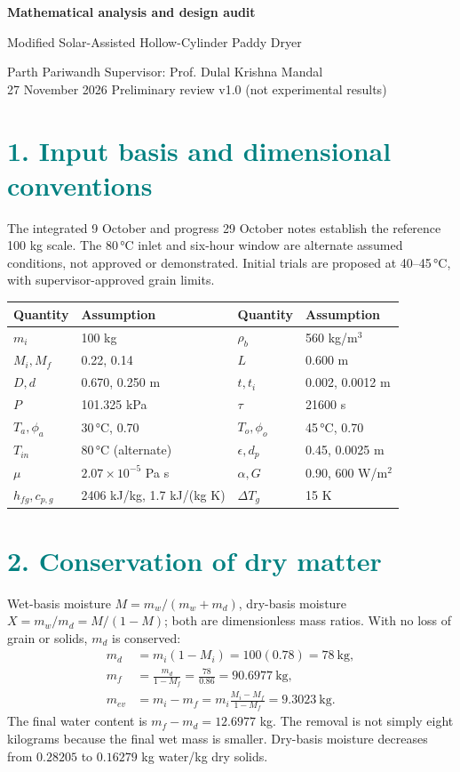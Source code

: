 \documentclass[11pt,a4paper]{article}
\newcommand{\sect}[1]{\section*{\textcolor{teal}{#1}}}
\begin{document}
{\LARGE\bfseries\color{navy} Mathematical analysis and design audit}\par
{\large Modified Solar-Assisted Hollow-Cylinder Paddy Dryer}\par
Parth Pariwandh \quad Supervisor: Prof. Dulal Krishna Mandal\\
27 November 2026 \quad Preliminary review v1.0 (not experimental results)
\sect{1. Input basis and dimensional conventions}
The integrated 9 October and progress 29 October notes establish the reference 100 kg scale. The 80\,\si{\celsius} inlet and six-hour window are alternate assumed conditions, not approved or demonstrated. Initial trials are proposed at 40--45\,\si{\celsius}, with supervisor-approved grain limits.
\begin{center}\begin{tabular}{ll@{\qquad}ll}\toprule
Quantity&Assumption&Quantity&Assumption\\\midrule
$m_i$&100 kg&$\rho_b$&560 kg/m$^3$\\
$M_i,M_f$&0.22, 0.14&$L$&0.600 m\\
$D,d$&0.670, 0.250 m&$t,t_i$&0.002, 0.0012 m\\
$P$&101.325 kPa&$\tau$&21600 s\\
$T_a,\phi_a$&30\,\si{\celsius}, 0.70&$T_o,\phi_o$&45\,\si{\celsius}, 0.70\\
$T_{in}$&80\,\si{\celsius} (alternate)&$\epsilon,d_p$&0.45, 0.0025 m\\
$\mu$&$2.07\times10^{-5}$ Pa s&$\alpha,G$&0.90, 600 W/m$^2$\\
$h_{fg},c_{p,g}$&2406 kJ/kg, 1.7 kJ/(kg K)&$\Delta T_g$&15 K\\\bottomrule
\end{tabular}\end{center}
\sect{2. Conservation of dry matter}
Wet-basis moisture $M=m_w/(m_w+m_d)$, dry-basis moisture $X=m_w/m_d=M/(1-M)$; both are dimensionless mass ratios. With no loss of grain or solids, $m_d$ is conserved:
\begin{align}
m_d&=m_i(1-M_i)=100(0.78)=78\ \mathrm{kg},\\
m_f&=\frac{m_d}{1-M_f}=\frac{78}{0.86}=90.6977\ \mathrm{kg},\\
m_{ev}&=m_i-m_f=m_i\frac{M_i-M_f}{1-M_f}=9.3023\ \mathrm{kg}.
\end{align}
The final water content is $m_f-m_d=12.6977$ kg. The removal is not simply eight kilograms because the final wet mass is smaller. Dry-basis moisture decreases from $0.28205$ to $0.16279$ kg water/kg dry solids.\par
\end{document}
